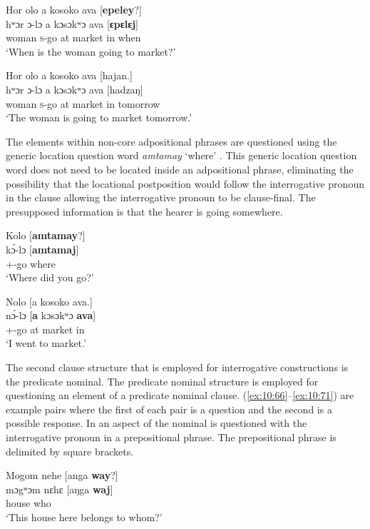 \ea \label{ex:10:62}
Hor  olo  a  kosoko  ava  [\textbf{epeley}?]\\
\gll  hʷɔr    ɔ-lɔ  a  kɔsɔkʷɔ  ava  [\textbf{ɛpɛlɛj}]\\
      woman  \textsc{s}-go  at  market  in  when\\
\glt  ‘When is the woman going to market?’
\z

\ea \label{ex:10:63}
Hor  olo  a  kosoko  ava  [hajan.]\\
\gll  hʷɔr    ɔ{}-lɔ  a  kɔsɔkʷɔ  ava  [hadzaŋ]\\
      woman  \textsc{s}-go  at  market  in  tomorrow\\
\glt  ‘The woman is going to market tomorrow.’
\z

The elements within non-core adpositional phrases are questioned using the generic location question word \textit{amtamay }‘where’ . This generic location question word does not need to be located inside an adpositional phrase, eliminating the possibility that the locational postposition would follow the interrogative pronoun in the clause allowing the interrogative pronoun to be clause-final. The presupposed information is that the hearer is going somewhere. 

\ea \label{ex:10:64}
Kolo  [\textbf{amtamay}?]\\
\gll  k\'{ɔ}-lɔ  [\textbf{amtamaj}] \\
      {\twoS}+{\PFV}-go  where\\
\glt  ‘Where did you go?’
\z

\ea \label{ex:10:65}
Nolo  [a  kosoko  ava.]\\
\gll  n\'{ɔ}-lɔ  [\textbf{a} kɔsɔkʷɔ    \textbf{ava}] \\
      {\oneS}+{\PFV}-go  at  market    in\\
\glt  ‘I went to market.’
\z

The second clause structure that is employed for interrogative constructions is the predicate nominal. The predicate nominal structure is employed for questioning an element of a predicate nominal clause. (\ref{ex:10:66}–\ref{ex:10:71}) are example pairs where the first of each pair is a question and the second is a possible response. In   an aspect of the nominal is questioned with the interrogative pronoun in a prepositional phrase. The prepositional phrase is delimited by square brackets.

\ea \label{ex:10:66}
Mogom  nehe  [anga  \textbf{way}?]\\
\gll mɔgʷɔm  nɛhɛ  [aŋga  \textbf{waj}]\\
      house  {\DEM}  {\POSS}  who\\
\glt  ‘This house here belongs to whom?’
\z

